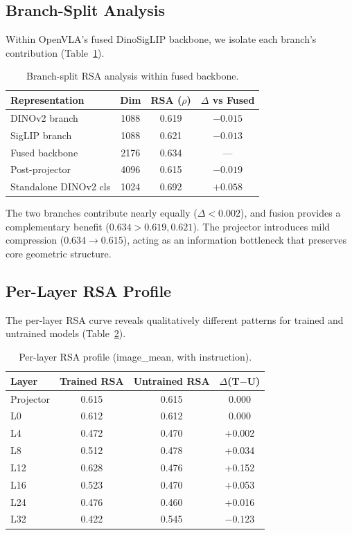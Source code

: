 \documentclass[10pt,twocolumn]{article}
\begin{document}
\subsection{Branch-Split Analysis}
\label{sec:branch}

Within OpenVLA's fused DinoSigLIP backbone, we isolate each branch's contribution (Table~\ref{tab:branch}).

\begin{table}[t]
\centering
\caption{Branch-split RSA analysis within fused backbone.}
\label{tab:branch}
\small
\begin{tabular}{lccc}
\toprule
Representation & Dim & RSA ($\rho$) & $\Delta$ vs Fused \\
\midrule
DINOv2 branch & 1088 & 0.619 & $-0.015$ \\
SigLIP branch & 1088 & 0.621 & $-0.013$ \\
Fused backbone & 2176 & 0.634 & --- \\
Post-projector & 4096 & 0.615 & $-0.019$ \\
Standalone DINOv2 cls & 1024 & 0.692 & $+0.058$ \\
\bottomrule
\end{tabular}
\end{table}

The two branches contribute nearly equally ($\Delta < 0.002$), and fusion provides a complementary benefit ($0.634 > 0.619, 0.621$).
The projector introduces mild compression ($0.634 \to 0.615$), acting as an information bottleneck that preserves core geometric structure.

\subsection{Per-Layer RSA Profile}
\label{sec:rsa_profile}

The per-layer RSA curve reveals qualitatively different patterns for trained and untrained models (Table~\ref{tab:perlayer_rsa}).

\begin{table}[t]
\centering
\caption{Per-layer RSA profile (image\_mean, with instruction).}
\label{tab:perlayer_rsa}
\small
\begin{tabular}{lccc}
\toprule
Layer & Trained RSA & Untrained RSA & $\Delta$(T$-$U) \\
\midrule
Projector & 0.615 & 0.615 & 0.000 \\
L0 & 0.612 & 0.612 & 0.000 \\
L4 & 0.472 & 0.470 & +0.002 \\
L8 & 0.512 & 0.478 & +0.034 \\
L12 & 0.628 & 0.476 & +0.152 \\
L16 & 0.523 & 0.470 & +0.053 \\
L24 & 0.476 & 0.460 & +0.016 \\
L32 & 0.422 & 0.545 & $-0.123$ \\
\bottomrule
\end{tabular}
\end{table}
\end{document}
